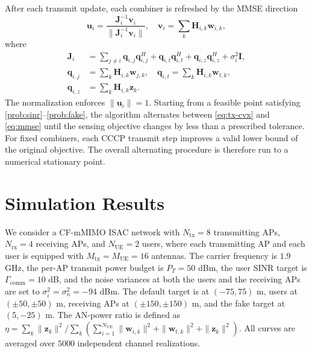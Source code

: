 \documentclass[lettersize,journal]{IEEEtran}
\begin{document}
After each transmit update, each combiner is refreshed by the MMSE direction
\begin{equation}
\mathbf{u}_i=\frac{\mathbf{J}_i^{-1}\mathbf{v}_i}{\|\mathbf{J}_i^{-1}\mathbf{v}_i\|},\quad \mathbf{v}_i=\sum_{k}\mathbf{H}_{i,k}\mathbf{w}_{i,k},
\label{eq:mmse}
\end{equation}
where
\begin{equation}
    \begin{aligned}
    \mathbf{J}_i&={\textstyle\sum_{j\neq i}}\mathbf{q}_{i,j}\mathbf{q}_{i,j}^H+\mathbf{q}_{i,t}\mathbf{q}_{i,t}^H
    +\mathbf{q}_{i,z}\mathbf{q}_{i,z}^H+\sigma_i^2\mathbf{I},\\
    \mathbf{q}_{i,j}&={\textstyle\sum_k}\mathbf{H}_{i,k}\mathbf{w}_{j,k},\quad
    \mathbf{q}_{i,t}={\textstyle\sum_k}\mathbf{H}_{i,k}\mathbf{w}_{t,k},\\
    \mathbf{q}_{i,z}&={\textstyle\sum_k}\mathbf{H}_{i,k}\mathbf{z}_k.
    \end{aligned}
    \label{eq:Jv}
\end{equation}
The normalization enforces $\|\mathbf{u}_i\|=1$. Starting from a feasible point satisfying \eqref{prob:sinr}--\eqref{prob:fake}, the algorithm alternates between \eqref{eq:tx-cvx} and \eqref{eq:mmse} until the sensing objective changes by less than a prescribed tolerance. For fixed combiners, each CCCP transmit step improves a valid lower bound of the original objective. The overall alternating procedure is therefore run to a numerical stationary point.

\section{Simulation Results}
We consider a CF-mMIMO ISAC network with $N_{\mathrm{tx}}=8$ transmitting APs, $N_{\mathrm{rx}}=4$ receiving APs, and $N_{\mathrm{UE}}=2$ users, where each transmitting AP and each user is equipped with $M_{\mathrm{tx}}=M_{\mathrm{UE}}=16$ antennas. The carrier frequency is $1.9$ GHz, the per-AP transmit power budget is $P_T=50$ dBm, the user SINR target is $\Gamma_{\mathrm{comm}}=10$ dB, and the noise variances at both the users and the receiving APs are set to $\sigma_i^2=\sigma_n^2=-94$ dBm. The default target is at $(-75,75)$ m, users at $(\pm 50,\pm 50)$ m, receiving APs at $(\pm 150,\pm 150)$ m, and the fake target at $(5,-25)$ m. The AN-power ratio is defined as $\eta=\sum_k\|\mathbf{z}_k\|^2/\sum_k\!\left(\sum_{i=1}^{N_{\mathrm{UE}}}\|\mathbf{w}_{i,k}\|^2+\|\mathbf{w}_{t,k}\|^2+\|\mathbf{z}_k\|^2\right)$. All curves are averaged over $5000$ independent channel realizations. 
\end{document}
